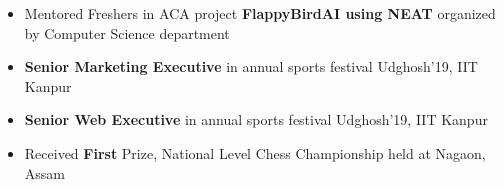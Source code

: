 
\begin{itemize}
  \item Mentored Freshers in ACA project \textbf{FlappyBirdAI using NEAT} organized by Computer Science department 
  \item \textbf{Senior Marketing Executive} in annual sports festival Udghosh’19, IIT Kanpur
  \item \textbf{Senior Web Executive} in annual sports festival Udghosh’19, IIT Kanpur
  \item Received \textbf{First} Prize, National Level Chess Championship held at Nagaon, Assam
\end{itemize}